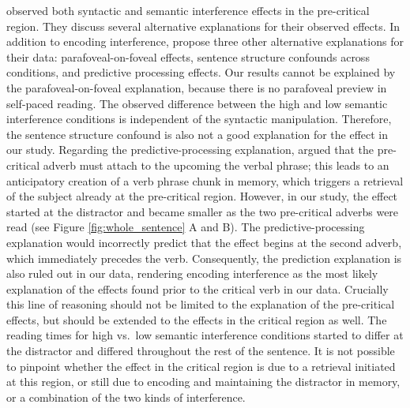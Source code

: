\documentclass[a4paper, man, floatsintext]{apa7}
\begin{document}
\cite{mertzen} observed both syntactic and semantic interference effects in the pre-critical region. 
They discuss several alternative explanations for their observed effects. In addition to encoding interference, \cite{mertzen} propose three other alternative explanations for their data: parafoveal-on-foveal effects, sentence structure confounds across conditions, and predictive processing effects. Our results cannot be explained by the parafoveal-on-foveal explanation, because there is no parafoveal preview in self-paced reading. The observed difference between the high and low semantic interference conditions is independent of the syntactic manipulation. Therefore, the sentence structure confound is also not a good explanation for the effect in our study. Regarding the predictive-processing explanation, \citet{mertzen} argued that the pre-critical adverb must attach to the upcoming the verbal phrase; this leads to an anticipatory creation of a verb phrase chunk in memory, which triggers a retrieval of the subject already at the pre-critical region. However, in our study, the effect started at the distractor and became smaller as the two pre-critical adverbs were read (see Figure \ref{fig:whole_sentence} A and B). The predictive-processing explanation would incorrectly predict that the effect begins at the second adverb, which immediately precedes the verb. Consequently, the prediction explanation is also ruled out in our data, rendering encoding interference as the most likely explanation of the effects found prior to the critical verb in our data. Crucially this line of reasoning should not be limited to the explanation of the pre-critical effects, but should be extended to the effects in the critical region as well. The reading times for high vs.\ low semantic interference conditions started to differ at the distractor and differed throughout the rest of the sentence. It is not possible to pinpoint whether the effect in the critical region is due to a retrieval initiated at this region, or still due to encoding and maintaining the distractor in memory, or a combination of the two kinds of interference.
\end{document}
